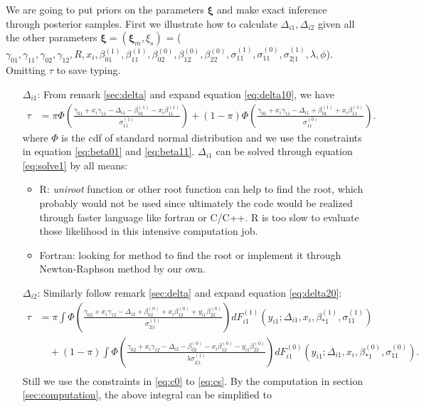 \documentclass[12pt]{article}
\begin{document}
We are going to put priors on the parameters $\bm \xi$ and make exact
inference through posterior samples. First we illustrate how to
calculate $\Delta_{i1}, \Delta_{i2}$ given all the other parameters
$\bm \xi = (\bm \xi_m, \xi_s)$ = ($\gamma_{01}, \gamma_{11},
\gamma_{02}, \gamma_{12}, R, x_i, \beta_{01}^{(1)}, \beta_{11}^{(1)},
\beta_{02}^{(0)}, \beta_{12}^{(0)}, \beta_{22}^{(0)},
\sigma_{11}^{(1)}, \sigma_{11}^{(0)}, \sigma_{2|1}^{(1)}, \lambda,
\phi$). Omitting $\tau$ to save typing.

\begin{enumerate}
\item [$\Delta_{i1}$: ] From remark \ref{sec:delta} and expand
  equation \eqref{eq:delta10}, we have
  \begin{align}\label{eq:solve1}
    \tau & = \pi \Phi \left( \frac{\gamma_{01}+ x_i\gamma_{11} -
        \Delta_{i1} - \beta_{01}^{(1)} -
        x_i\beta_{11}^{(1)}}{\sigma_{11}^{(1)}} \right) + (1-\pi) \Phi
    \left( \frac{\gamma_{01} + x_i\gamma_{11} - \Delta_{i1} +
        \beta_{01}^{(1)} + x_i\beta_{11}^{(1)}}{\sigma_{11}^{(0)}}
    \right).
  \end{align}
  where $\Phi$ is the cdf of standard normal distribution and we use
  the constraints in equation \eqref{eq:beta01} and \eqref{eq:beta11}.
  $\Delta_{i1}$ can be solved through equation \eqref{eq:solve1} by
  all means:
  \begin{itemize}
  \item R: \textit{uniroot} function or other root function can help
    to find the root, which probably would not be used since
    ultimately the code would be realized through faster language like
    fortran or C/C++. R is too slow to evaluate those likelihood in
    this intensive computation job.
  \item Fortran: looking for method to find the root or implement it
    through Newton-Raphson method by our own.
  \end{itemize}
\item [$\Delta_{i2}$: ] Similarly follow remark \ref{sec:delta} and
  expand equation \eqref{eq:delta20}:
  \begin{align}
    \tau & = \pi \int \Phi \left( \frac{\gamma_{02} + x_i\gamma_{12} - \Delta_{i2} + \beta_{02}^{(0)} + x_i\beta_{12}^{(0)} + y_{i1}\beta_{22}^{(0)}}{\sigma_{2|1}^{(1)}} \right) dF_{i1}^{(1)}(y_{i1}; \Delta_{i1}, x_i, \beta_{*1}^{(1)}, \sigma_{11}^{(1)}) \\
    \label{eq:solve2}
    & \quad + (1-\pi) \int \Phi \left( \frac{\gamma_{02} + x_i\gamma_{12} - \Delta_{i2} - \beta_{02}^{(0)} - x_i\beta_{12}^{(0)} - y_{i1}\beta_{22}^{(0)}}{\lambda\sigma_{2|1}^{(1)}} \right) dF_{i1}^{(0)}(y_{i1}; \Delta_{i1}, x_i, \beta_{*1}^{(0)}, \sigma_{11}^{(0)}). \\
  \end{align}
  Still we use the constraints in \eqref{eq:c0} to
  \eqref{eq:cs}.
By the computation in section \ref{sec:computation}, the above integral can be simplified to 


\end{enumerate}
\end{document}

